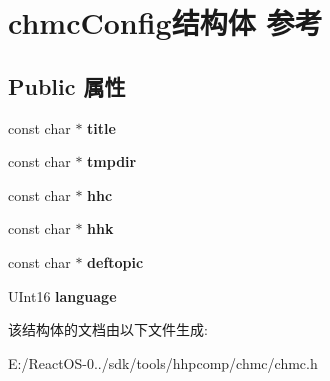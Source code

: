 \hypertarget{structchmc_config}{}\section{chmc\+Config结构体 参考}
\label{structchmc_config}
\subsection*{Public 属性}
\begin{DoxyCompactItemize}
\item 
\mbox{\label{structchmc_config_a446246a1f72659e717949611f8552656}} 
const char $\ast$ {\bfseries title}
\item 
\mbox{\label{structchmc_config_ac395f013a03dc17e7221543643ecf491}} 
const char $\ast$ {\bfseries tmpdir}
\item 
\mbox{\label{structchmc_config_a2980a309ddb18162c99b2112af676952}} 
const char $\ast$ {\bfseries hhc}
\item 
\mbox{\label{structchmc_config_a5ec799a4ac3006ba81aa356405d212da}} 
const char $\ast$ {\bfseries hhk}
\item 
\mbox{\label{structchmc_config_a7eaa7fde326a3a408f08fb4fdaba29b8}} 
const char $\ast$ {\bfseries deftopic}
\item 
\mbox{\label{structchmc_config_a36c93c9b14700ec5df0941cafb277c13}} 
U\+Int16 {\bfseries language}
\end{DoxyCompactItemize}


该结构体的文档由以下文件生成\+:\begin{DoxyCompactItemize}
\item 
E\+:/\+React\+O\+S-\/0../sdk/tools/hhpcomp/chmc/chmc.\+h\end{DoxyCompactItemize}
